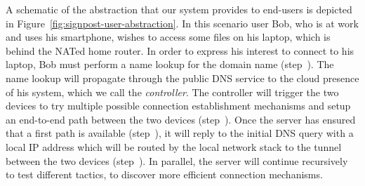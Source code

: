 A schematic of the abstraction that our system provides to end-users is depicted
in Figure~\ref{fig:signpost-user-abstraction}. In this scenario user Bob, who is
at work and uses his smartphone, wishes to access some files on his laptop,
which is behind the NATed home router. In order to express his interest to
connect to his laptop, Bob must perform a name lookup for the domain name
 (step~). The name lookup will propagate through the
public DNS service to the cloud presence of his \signpost system, which we call
the {\it \signpost controller}. The \signpost controller will trigger the two
devices to try multiple possible connection establishment mechanisms and setup
an end-to-end path between the two devices (step~). Once the server
has ensured that a first path is available (step~), it will reply to
the initial DNS query with a local IP address which will be routed by the local
network stack to the tunnel between the two devices (step~).  In
parallel, the server will continue recursively to test different tactics, to
discover more efficient connection mechanisms. 




